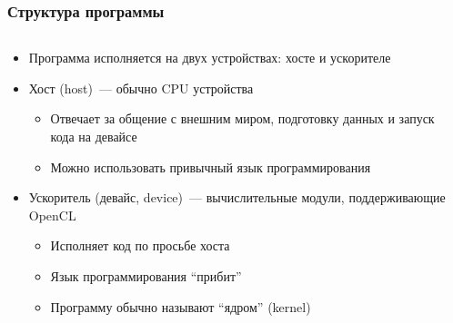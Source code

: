 \documentclass[
    aspectratio=169,
]{beamer}
\begin{document}
\begin{frame}
    \frametitle{Структура программы}

    \begin{columns}[T]
        \begin{column}{0.7\textwidth}
            \begin{itemize}
                \item Программа исполняется на двух устройствах: хосте и ускорителе
                \item Хост (host)~--- обычно CPU устройства
                      \begin{itemize}
                          \item Отвечает за общение с внешним миром, подготовку данных и запуск кода на девайсе
                          \item Можно использовать привычный язык программирования
                      \end{itemize}
                \item Ускоритель (девайс, device)~--- вычислительные модули, поддерживающие OpenCL
                      \begin{itemize}
                          \item Исполняет код по просьбе хоста
                          \item Язык программирования \enquote{прибит}
                          \item Программу обычно называют \enquote{ядром} (kernel)
                      \end{itemize}
            \end{itemize}
        \end{column}
        \begin{column}{0.3\textwidth}

\end{column}
\end{columns}
\end{frame}
\end{document}
